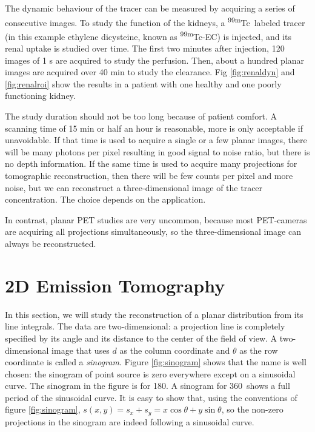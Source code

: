 The dynamic behaviour of the tracer can be measured by acquiring a
series of consecutive images. To study the function of the kidneys, a
\textsuperscript{99m}Tc\ labeled tracer (in this example ethylene dicysteine, known
as \textsuperscript{99m}Tc-EC) is injected, and its renal uptake is studied over
time. The first two minutes after injection, 120 images of 1 s are
acquired to study the perfusion. Then, about a hundred planar images
are acquired over 40 min to study the clearance. Fig
\ref{fig:renaldyn} and \ref{fig:renalroi} show the results in a
patient with one healthy and one poorly functioning kidney.

The study duration should not be too long because of patient
comfort. A scanning time of 15 min or half an hour is reasonable, more
is only acceptable if unavoidable. If that time is used to acquire a
single or a few planar images, there will be many photons per pixel
resulting in good signal to noise ratio, but there is no depth
information.  If the same time is used to acquire many projections for
tomographic reconstruction, then there will be few counts per pixel
and more noise, but we can reconstruct a three-dimensional image of
the tracer concentration. The choice depends on the application.

In contrast, planar PET studies are very uncommon, because most PET-cameras
are acquiring all projections simultaneously, so the three-dimensional image
can always be reconstructed.

\section{2D Emission Tomography}

In this section, we will study the reconstruction of a planar distribution
from its line integrals. The data are two-dimensional: a projection line is
completely specified by its angle and its distance to the center of the field
of view. A two-dimensional image that uses $d$ as the column coordinate and
$\theta$ as the row coordinate is called a {\em sinogram}. Figure
\ref{fig:sinogram} shows that the name is well chosen: the sinogram of point
source is zero everywhere except on a sinusoidal curve. The sinogram in the
figure is for 180\textdegree. A sinogram for 360\textdegree\ shows a full period of
the sinusoidal curve. It is easy to show that, using the conventions of figure
\ref{fig:sinogram}, $s(x,y) = s_x + s_y = x \cos \theta + y \sin \theta$, so
the non-zero projections in the sinogram are indeed following a sinusoidal
curve.

